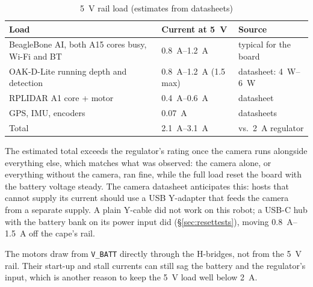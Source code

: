 \begin{table}[htbp]
\centering
\caption{\SI{5}{V} rail load (estimates from datasheets)}
\label{tab:budget}
\small
\begin{tabularx}{\linewidth}{>{\raggedright\arraybackslash}X l l}
\toprule
Load & Current at \SI{5}{V} & Source \\
\midrule
BeagleBone AI, both A15 cores busy, Wi-Fi and BT & \SIrange{0.8}{1.2}{A} & typical for the board \\
OAK-D-Lite running depth and detection & \SIrange{0.8}{1.2}{A} (1.5 max) & datasheet: \SIrange{4}{6}{W} \\
RPLIDAR A1 core + motor & \SIrange{0.4}{0.6}{A} & datasheet \\
GPS, IMU, encoders & \SI{0.07}{A} & datasheets \\
\midrule
Total & \SIrange{2.1}{3.1}{A} & vs.\ \SI{2}{A} regulator \\
\bottomrule
\end{tabularx}
\end{table}

The estimated total exceeds the regulator's rating once the camera runs
alongside everything else, which matches what was observed: the camera
alone, or everything without the camera, ran fine, while the full load reset
the board with the battery voltage steady. The camera datasheet anticipates
this: hosts that cannot supply its current should use a USB Y-adapter that
feeds the camera from a separate supply. A plain Y-cable did not work on
this robot; a USB-C hub with the battery bank on its power input did
(\S\ref{sec:resettests}), moving \SIrange{0.8}{1.5}{A} off the cape's rail.

The motors draw from \texttt{V\_BATT} directly through the H-bridges, not
from the \SI{5}{V} rail. Their start-up and stall currents can still sag the
battery and the regulator's input, which is another reason to keep the
\SI{5}{V} load well below \SI{2}{A}.
